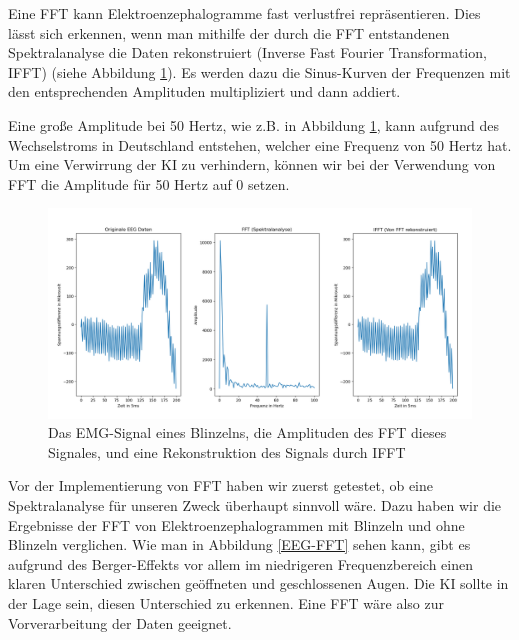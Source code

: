 \documentclass[11pt]{scrartcl}
\begin{document}
	Eine FFT kann Elektroenzephalogramme fast verlustfrei repräsentieren. Dies lässt sich erkennen, wenn man mithilfe der durch die FFT entstandenen Spektralanalyse die Daten rekonstruiert (Inverse Fast Fourier Transformation, IFFT) (siehe Abbildung \ref{EEG-IFFT}). Es werden dazu die Sinus-Kurven der Frequenzen mit den entsprechenden Amplituden multipliziert und dann addiert.

	Eine große Amplitude bei 50 Hertz, wie z.B. in Abbildung \ref{EEG-IFFT}, kann aufgrund des Wechselstroms in Deutschland entstehen, welcher eine Frequenz von 50 Hertz hat. \cite{Praktikum} Um eine Verwirrung der KI zu verhindern, können wir bei der Verwendung von FFT die Amplitude für 50 Hertz auf 0 setzen.

	\begin{figure}[h!]
		\includegraphics[width=\textwidth]{pictures/blink_fft_ifft.png}
		\caption{Das EMG-Signal eines Blinzelns, die Amplituden des FFT dieses Signales, und eine Rekonstruktion des Signals durch IFFT}
		\label{EEG-IFFT}
	\end{figure}

	Vor der Implementierung von FFT haben wir zuerst getestet, ob eine Spektralanalyse für unseren Zweck überhaupt sinnvoll wäre. Dazu haben wir die Ergebnisse der FFT von Elektroenzephalogrammen mit Blinzeln und ohne Blinzeln verglichen. Wie man in Abbildung \ref{EEG-FFT} sehen kann, gibt es aufgrund des Berger-Effekts vor allem im niedrigeren Frequenzbereich einen klaren Unterschied zwischen geöffneten und geschlossenen Augen.
	Die KI sollte in der Lage sein, diesen Unterschied zu erkennen. Eine FFT wäre also zur Vorverarbeitung der Daten geeignet.

\end{document}
